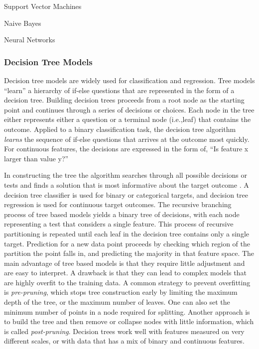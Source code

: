\documentclass[sigconf]{acmart}
\begin{document}
Support Vector Machines


Naive Bayes


Neural Networks


\subsubsection{Decision Tree Models}

Decision tree models are widely used for classification and regression. Tree 
models ``learn'' a hierarchy of if-else questions that are represented in the
form of a decision tree. Building decision trees proceeds from a root node as 
the starting point and continues through a series of decisions or choices.
Each node in the tree either represents either a question or a terminal node 
(i.e.,leaf) that contains the outcome. Applied to a binary classification task, 
the decision tree algorithm \emph{learns} the sequence of if-else questions 
that arrives at the outcome most quickly. For continuous features, the 
decisions are expressed in the form of, ``Is feature x larger than value y?''

In constructing the tree the algorithm searches through all
possible decisions or tests and finds a solution that is most informative 
about the target outcome \cite{muller17}. A decision tree classifier is used 
for binary or categorical targets, and decision tree regression is used for 
continuous target outcomes. The recursive branching process of tree based 
models yields a binary tree of decisions, with each node representing a test 
that considers a single feature. This process of recursive partitioning is 
repeated until each leaf in the decision tree contains only a single target. 
Prediction for a new data point proceeds by checking which region of the 
partition the point falls in, and predicting the majority in that feature space. 
The main advantage of tree based models is that they require little adjustment 
and are easy to interpret. A drawback is that they can lead to complex models 
that are highly overfit to the training data. A common strategy to prevent 
overfitting is \emph{pre-pruning}, which stops tree construction early by 
limiting the maximum depth of the tree, or the maximum number of leaves. 
One can also set the minimum number of points in a node required for splitting. 
Another approach is to build the tree and then remove or collapse nodes with 
little information, which is called \emph{post-pruning}. Decision trees work 
well with features measured on very different scales, or with data that has 
a mix of binary and continuous features. 
\end{document}

